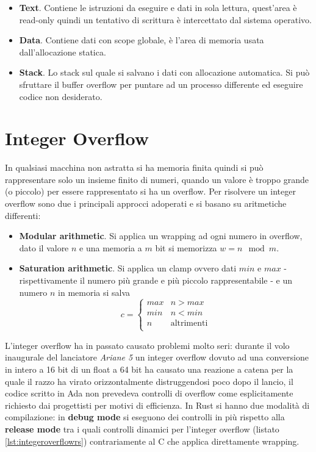\documentclass[Lau,binding=0.6cm]{sapthesis}
\begin{document}
\begin{itemize}
	\item \textbf{Text}. Contiene le istruzioni da eseguire e dati in sola lettura, quest'area è read-only quindi un tentativo di scrittura è intercettato dal sistema operativo. 
    	\item \textbf{Data}. Contiene dati con scope globale, è l'area di memoria usata dall'allocazione statica.
    	\item \textbf{Stack}. Lo stack sul quale si salvano i dati con allocazione automatica.
		Si può sfruttare il buffer overflow per puntare ad un processo differente ed eseguire codice non desiderato.
\end{itemize}

\section{Integer Overflow} \label{sec:integer_overflow}
In qualsiasi macchina non astratta si ha memoria finita quindi si può rappresentare solo un insieme finito di numeri, quando un valore è troppo grande (o piccolo) per essere rappresentato si ha un overflow.
Per risolvere un integer overflow sono due i principali approcci adoperati e si basano su aritmetiche differenti:
\begin{itemize}
    \item \textbf{Modular arithmetic}. Si applica un wrapping ad ogni numero in overflow, dato il valore $ n $ e una memoria a $ m $ bit si memorizza $ w = n \mod m $.
    \item \textbf{Saturation arithmetic}. Si applica un clamp ovvero dati $ min $ e $ max $ - rispettivamente il numero più grande e più piccolo rappresentabile - e un numero $ n $ in memoria si salva
    \begin{equation*}
        c = \begin{cases}
            max & n > max \\
            min & n < min \\
            n  & \text{altrimenti} \\
        \end{cases}
    \end{equation*}
\end{itemize}

L'integer overflow ha in passato causato problemi molto seri: durante il volo inaugurale del lanciatore \textit{Ariane 5} un integer overflow dovuto ad una conversione in intero a 16 bit di un float a 64 bit ha causato una reazione a catena per la quale il razzo ha virato orizzontalmente distruggendosi poco dopo il lancio, il codice scritto in Ada non prevedeva controlli di overflow come esplicitamente richiesto dai progettisti per motivi di efficienza. 
In Rust si hanno due modalità di compilazione: in \textbf{debug mode} si eseguono dei controlli in più rispetto alla \textbf{release mode} tra i quali controlli dinamici per l'integer overflow (listato \ref{lst:integeroverflowrs}) contrariamente al C che applica direttamente wrapping.
\end{document}
